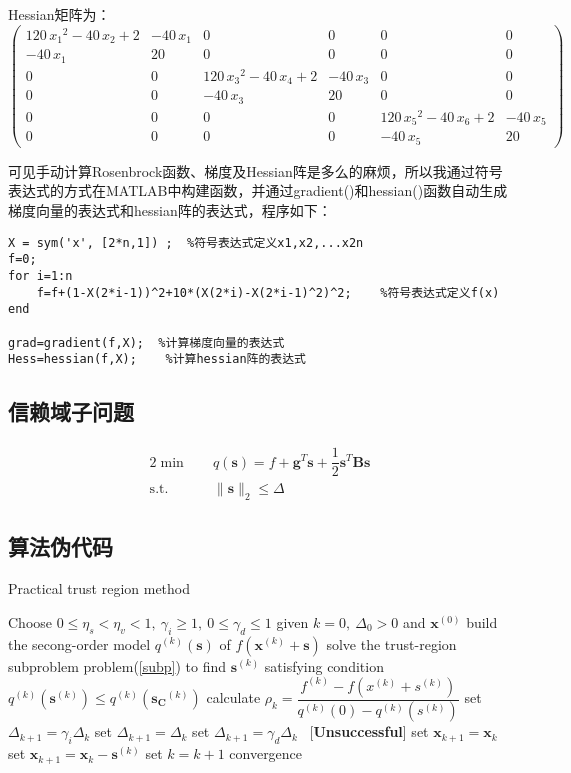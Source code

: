 Hessian矩阵为：
\[ \left(\begin{array}{cccccc} 120\,{x_{1}}^2-40\,x_{2}+2 & -40\,x_{1} & 0 & 0 & 0 & 0\\ -40\,x_{1} & 20 & 0 & 0 & 0 & 0\\ 0 & 0 & 120\,{x_{3}}^2-40\,x_{4}+2 & -40\,x_{3} & 0 & 0\\ 0 & 0 & -40\,x_{3} & 20 & 0 & 0\\ 0 & 0 & 0 & 0 & 120\,{x_{5}}^2-40\,x_{6}+2 & -40\,x_{5}\\ 0 & 0 & 0 & 0 & -40\,x_{5} & 20 \end{array}\right)\]


可见手动计算Rosenbrock函数、梯度及Hessian阵是多么的麻烦，所以我通过符号表达式的方式在MATLAB中构建函数，并通过gradient()和hessian()函数自动生成梯度向量的表达式和hessian阵的表达式，程序如下：

\begin{lstlisting}
X = sym('x', [2*n,1]) ;  %符号表达式定义x1,x2,...x2n
f=0;    
for i=1:n
    f=f+(1-X(2*i-1))^2+10*(X(2*i)-X(2*i-1)^2)^2;    %符号表达式定义f(x)
end

grad=gradient(f,X);  %计算梯度向量的表达式
Hess=hessian(f,X);    %计算hessian阵的表达式
\end{lstlisting}



\subsection*{信赖域子问题}
\begin{alignat}{2}
\min \quad & q(\bm{s})=f+\bm{g}^{T}\bm{s}+\dfrac{1}{2}\bm{s}^T\bm{Bs} \label{subp} \\
\mbox{s.t.}\quad
&\|\bm{s}\|_2\leq\Delta \nonumber
\end{alignat}

\newpage
\subsection{算法伪代码}
\begin{algorithm}[h]  
\caption{Practical trust region method}  
\begin{algorithmic}[1]  
\STATE Choose $0\leq \eta_s<\eta_v<1,\ \gamma_i \geq 1,\ 0\leq \gamma_d\leq 1$
\STATE given $k=0,\ \Delta_0>0$ and $\bm{x}^{(0)}$
\REPEAT 
			\STATE build the secong-order model $q^{(k)}(\bm{s})$ of $f(\bm{x}^{(k)}+\bm{s})$
			\STATE solve the trust-region subproblem problem(\ref{subp}) to find $\bm{s}^{(k)}$ satisfying condition $q^{(k)}(\bm{s}^{(k)})\leq q^{(k)}(\bm{s_C}^{(k)})$
			\STATE calculate $\rho_k=\dfrac{f^{(k)}-f(x^{(k)}+s^{(k)})}{q^{(k)}(0)-q^{(k)}(s^{(k)})}$ 						
			\STATE set $\Delta_{k+1}=\gamma_i\Delta_k$
			\ELSE
						\STATE set $\Delta_{k+1}=\Delta_k$
				\ELSE
						\STATE set $\Delta_{k+1}=\gamma_d\Delta_k$ \  [\textbf{Unsuccessful}]
				\ENDIF
			\ENDIF
				\STATE set $\bm{x}_{k+1}=\bm{x}_{k}$
				\ELSE
					\STATE  set $\bm{x}_{k+1}=\bm{x}_{k}-\bm{s}^{(k)}$
			\ENDIF
			\STATE set $k=k+1$
\UNTIL convergence
\end{algorithmic}  
\end{algorithm}  

